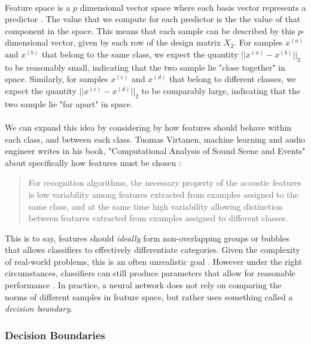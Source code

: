 \documentclass[12pt,letterpaper]{article}
\begin{document}
\paragraph*{}Feature space is a $p$ dimensional vector space where each basis vector represents a predictor \cite{Goodfellow,James}. The value that we compute for each predictor is the the value of that component in the space. This means that each sample can be described by this $p$-dimensional vector, given by each row of the design matrix $X_2$. For samples $x^{(a)}$ and $x^{(b)}$ that belong to the same class, we expect the quantity $||x^{(a)} - x^{(b)}||_{2}$ to be reasonably small, indicating that the two sample lie "close together" in space. Similarly, for samples $x^{(c)}$ and $x^{(d)}$ that belong to different classes, we expect the quantity $||x^{(c)} - x^{(d)}||_{2}$ to be comparably large, indicating that the two sample lie "far apart" in space.

\paragraph*{}We can expand this idea by considering by how features should behave within each class, and between each class. Tuomas Virtanen, machine learning and audio engineer writes in his book, "Computational Analysis of Sound Scene and Events" about specifically how features must be chosen \cite{Virtanen}:
\begin{quote}
For recognition algorithms, the necessary property of the acoustic features is low variability among features extracted from examples assigned to the same class, and at the same time high variability allowing distinction between features extracted from examples assigned to different classes.
\end{quote}
This is to say, features should \textit{ideally} form non-overlapping groups or bubbles that allows classifiers to effectively differentiate categories. Given the complexity of real-world problems, this is an often unrealistic goal \cite{Goodfellow,James}. However under the right circumstances, classifiers can still produce parameters that allow for reasonable performance \cite{Geron,Loy}. In practice, a neural network does not rely on comparing the norms of different samples in feature space, but rather uses something called a \textit{decision boundary}.

\subsubsection{Decision Boundaries}
\end{document}
